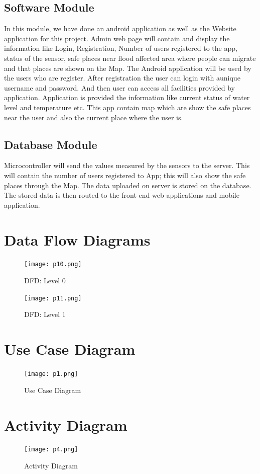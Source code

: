 \documentclass[a4paper,12pt]{report}
\begin{document}
\begin{itemize}
\subsection{Software Module}
 In this module, we have done an android application as well as the Website application for this project. Admin web page will contain and display the information like Login, Registration, Number of users registered to the app, status of the sensor, safe places near flood affected area where people can migrate and that places are shown on the Map. The Android application will be used by the users who are register. After registration the user can login with aunique username and password. And then user can access all facilities provided by application. Application is provided the information like current status of water level and temperature etc. This app contain map which are show the safe places near the user and also the current place where the user is. 
\subsection{Database Module}
 Microcontroller will send the values measured by the sensors to the server. This will contain the number of users registered to App; this will also show the safe places through the Map. The data uploaded on server is stored on the database. The stored data is then routed to the front end web applications and mobile application.

\section{Data Flow Diagrams}
\begin{figure}[H]
  \texttt{[image: p10.png]}
  \caption{DFD: Level 0}
  \label{fig:boat1}
\end{figure}

\begin{figure}[H]
  \texttt{[image: p11.png]}
  \caption{DFD: Level 1}
  \label{fig:boat1}
\end{figure}

\section{Use Case Diagram}
\begin{figure}[H]
  \texttt{[image: p1.png]}
  \caption{Use Case Diagram}
  \label{fig:boat1}
\end{figure}

\section{Activity Diagram}
\begin{figure}[H]
  \texttt{[image: p4.png]}
  \caption{Activity Diagram}
  \label{fig:boat1}
\end{figure}


\end{itemize}
\end{document}
